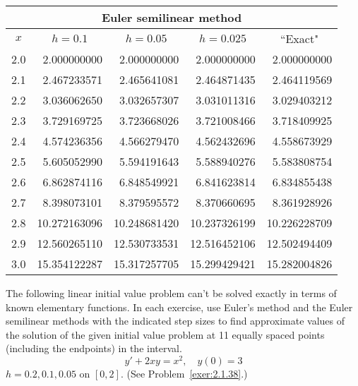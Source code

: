 \documentclass{ximera}
\begin{document}
\begin{problem}
\begin{solution}
{\small
\begin{tabular}{|c|r|r|r|r|}
\hline
\multicolumn{5}{|c|}{Euler semilinear method}\\\hline
\multicolumn{1}{|c|}{$x$}&
\multicolumn{1}{|c|}{$h=0.1$}&
\multicolumn{1}{|c|}{$h=0.05$}&
\multicolumn{1}{|c|}{$h=0.025$}&
\multicolumn{1}{|c|}{``Exact"}\\ \hline
2.0 &  2.000000000 &  2.000000000 &  2.000000000 &  2.000000000 \\
2.1 &  2.467233571 &  2.465641081 &  2.464871435 &  2.464119569 \\
2.2 &  3.036062650 &  3.032657307 &  3.031011316 &  3.029403212 \\
2.3 &  3.729169725 &  3.723668026 &  3.721008466 &  3.718409925 \\
2.4 &  4.574236356 &  4.566279470 &  4.562432696 &  4.558673929 \\
2.5 &  5.605052990 &  5.594191643 &  5.588940276 &  5.583808754 \\
2.6 &  6.862874116 &  6.848549921 &  6.841623814 &  6.834855438 \\
2.7 &  8.398073101 &  8.379595572 &  8.370660695 &  8.361928926 \\
2.8 & 10.272163096 & 10.248681420 & 10.237326199 & 10.226228709 \\
2.9 & 12.560265110 & 12.530733531 & 12.516452106 & 12.502494409 \\
3.0 & 15.354122287 & 15.317257705 & 15.299429421 & 15.282004826 \\
\hline
\end{tabular}}
\end{solution}
\end{problem}

\begin{problem}\label{exer:3.1.15} The following linear initial value problem can't be solved exactly in terms of known elementary functions. In each exercise, use
Euler's method and the Euler semilinear methods
with the indicated step sizes to find approximate values of the
solution of the given initial value problem at 11 equally spaced
points (including the endpoints) in the interval.
$$y'+2xy=x^2,\quad y(0)=3$$
$h=0.2,0.1,0.05$ on $[0,2]$. (See Problem~\ref{exer:2.1.38}.)
\end{problem}
\end{document}
